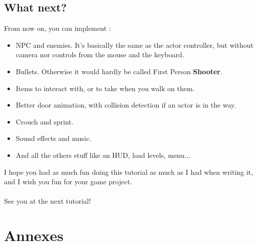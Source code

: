 \documentclass[10pt,a4paper]{article}
\begin{document}
\subsection{What next?}
From now on, you can implement :
\begin{itemize}
\item NPC and enemies. It's basically the same as the actor controller, but without camera nor controls from the mouse and the keyboard.
\item Bullets. Otherwise it would hardly be called First Person \textbf{Shooter}.
\item Items to interact with, or to take when you walk on them.
\item Better door animation, with collision detection if an actor is in the way.
\item Crouch and sprint.
\item Sound effects and music.
\item And all the others stuff like an HUD, load levels, menu...
\end{itemize}
I hope you had as much fun doing this tutorial as much as I had when writing it, and I wish you fun for your game project.\\
\\
See you at the next tutorial!
\section{Annexes}
\end{document}
